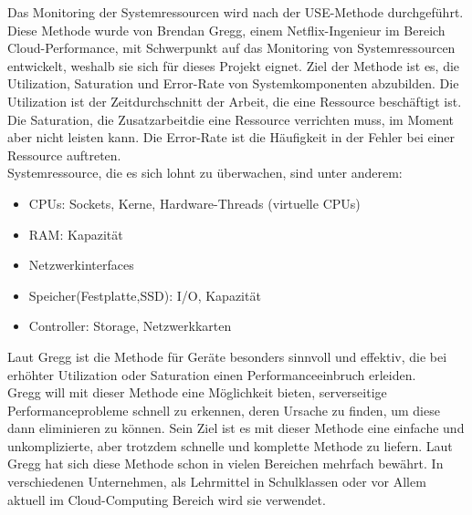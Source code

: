 \documentclass[a4paper,10pt]{scrartcl}
\begin{document}
Das Monitoring der Systemressourcen wird nach der \glqq USE\grqq-Methode durchgeführt. Diese Methode wurde von Brendan Gregg, einem Netflix-Ingenieur im Bereich Cloud-Performance, mit Schwerpunkt auf das Monitoring von Systemressourcen entwickelt, weshalb sie sich für dieses Projekt eignet.
Ziel der Methode ist es, die Utilization, Saturation und Error-Rate von Systemkomponenten abzubilden. Die Utilization ist der Zeitdurchschnitt der Arbeit, die eine Ressource beschäftigt ist. Die Saturation, die \glqq Zusatzarbeit\grqq die eine Ressource verrichten muss, im Moment aber nicht leisten kann. Die Error-Rate ist die Häufigkeit in der Fehler bei einer Ressource auftreten.\\
Systemressource, die es sich lohnt zu überwachen, sind unter anderem:\\

\begin{itemize}
\item CPUs: Sockets, Kerne, Hardware-Threads (virtuelle CPUs)
\item RAM: Kapazität
\item Netzwerkinterfaces
\item Speicher(Festplatte,SSD): I/O, Kapazität
\item Controller: Storage, Netzwerkkarten
\end{itemize}

Laut Gregg ist die Methode für Geräte besonders sinnvoll und effektiv, die bei erhöhter Utilization oder Saturation einen Performanceeinbruch erleiden.\\

Gregg will mit dieser Methode eine Möglichkeit bieten, serverseitige Performanceprobleme schnell zu erkennen, deren Ursache zu finden, um diese dann eliminieren zu können. Sein Ziel ist es mit dieser Methode eine einfache und unkomplizierte, aber trotzdem schnelle und komplette Methode zu liefern. Laut Gregg hat sich diese Methode schon in vielen Bereichen mehrfach bewährt. In verschiedenen Unternehmen, als Lehrmittel in Schulklassen oder vor Allem aktuell im Cloud-Computing Bereich wird sie verwendet.\\
\end{document}

